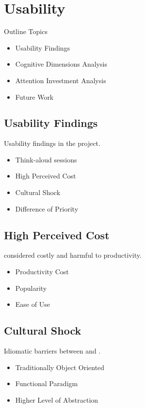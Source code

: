 \section{Usability}
\begin{frame}{\secname}{Outline}
	Topics
	\begin{itemize}
		\item Usability Findings
		\item Cognitive Dimensions Analysis
		\item Attention Investment Analysis
		\item Future Work
	\end{itemize}
\end{frame}

\subsection{Usability Findings}
\begin{frame}{\secname}{\subsecname}
	Usability findings in the project.
	\begin{itemize}
		\item<2-> Think-aloud sessions
		\item<3-> High Perceived Cost
		\item<4-> Cultural Shock
		\item<5-> Difference of Priority
	\end{itemize}
\end{frame}

\subsection{High Perceived Cost}
\begin{frame}{\secname}{\subsecname}
	\fs considered costly and harmful to productivity.
	\begin{itemize}
		\item<2-> Productivity Cost
		\item<3-> Popularity
		\item<4-> Ease of Use
	\end{itemize}
\end{frame}

\subsection{Cultural Shock}
\begin{frame}{\secname}{\subsecname}
	Idiomatic barriers between \cs and \fs.
	\begin{itemize}
		\item<2-> Traditionally Object Oriented
		\item<3-> Functional Paradigm
		\item<4-> Higher Level of Abstraction
	\end{itemize}
\end{frame}


